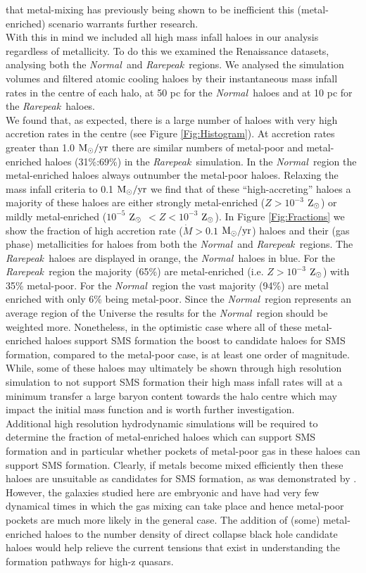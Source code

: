 \documentclass[graphics, twocolumn, usenatbib]{mn2e}
\newcommand{\msolaryr} {$\rm{M_{\odot}/yr}~$}
\newcommand{\msolaryrc} {$\rm{M_{\odot}/yr}$}
\newcommand{\zsolar} {$\rm{Z_{\odot}}~$}
\newcommand{\zsolarc} {$\rm{Z_{\odot}}$}
\newcommand{\rarepeak} {\textit{Rarepeak~}}
\newcommand{\normal} {\textit{Normal~}}
\begin{document}
that metal-mixing has previously being shown to be inefficient \citep[e.g.][]{Smith_2015} this
(metal-enriched) scenario warrants further research. \\
\indent With this in mind we included all high mass infall haloes in our analysis regardless of
metallicity. To do this we examined the Renaissance datasets, analysing
both the \normal and \rarepeak regions. We analysed the simulation volumes and filtered atomic
cooling haloes by their instantaneous mass infall rates in the centre of each halo, at 50 pc for
the \normal haloes and at 10 pc for the \rarepeak haloes.  \\
\indent We found that, as expected, there is a large number of haloes with very high accretion rates
in the centre (see Figure \ref{Fig:Histogram}). At accretion rates
greater than 1.0 \msolaryr there are similar numbers of metal-poor and metal-enriched haloes
(31\%:69\%) in the \rarepeak simulation. In the \normal region the metal-enriched haloes always
outnumber the metal-poor haloes. Relaxing the mass infall criteria to 0.1  \msolaryr we find
that of these ``high-accreting'' haloes a majority of these haloes are either strongly
metal-enriched ($Z > 10^{-3}$ \zsolarc) or mildly metal-enriched
($10^{-5}$ \zsolar $ < Z < 10^{-3}$ \zsolarc). In Figure \ref{Fig:Fractions}  we show the fraction
of high accretion rate ($\dot{M} > 0.1$ \msolaryrc) haloes and their (gas phase) metallicities
for haloes from both the \normal and \rarepeak regions. The \rarepeak haloes are displayed in orange,
the \normal haloes in blue. For the \rarepeak region the majority (65\%) are metal-enriched (i.e.
$Z > 10^{-3}$ \zsolarc) with 35\% metal-poor. For the \normal region the vast majority (94\%)
are metal enriched with only 6\% being metal-poor. Since the \normal region represents an average
region of the Universe the results for the \normal region should be weighted more. Nonetheless, 
in the optimistic case where all of these metal-enriched haloes support SMS formation the boost to
candidate haloes for SMS formation, compared to the metal-poor case, is at least one order of
magnitude. While,
some of these haloes may ultimately be shown through high resolution simulation to not support SMS
formation their high mass infall rates will at a minimum transfer a large baryon content towards the
halo centre which may impact the initial mass function and is worth further investigation. \\
\indent Additional high resolution hydrodynamic simulations will be required to
determine the fraction of metal-enriched haloes which can support SMS formation and in particular
whether pockets of metal-poor gas in these haloes can support SMS formation. Clearly, if metals
become mixed efficiently then these haloes are unsuitable as candidates for SMS formation, as
was demonstrated by \cite{Chon_2020}. However,
the galaxies studied here are embryonic and have had very few dynamical times in which the
gas mixing can take place and hence metal-poor pockets are much more likely in the general case.
The addition of (some) metal-enriched haloes to the number density of direct collapse black hole
candidate haloes would help relieve the current tensions that exist in understanding the formation
pathways for high-z quasars. 
\end{document}
